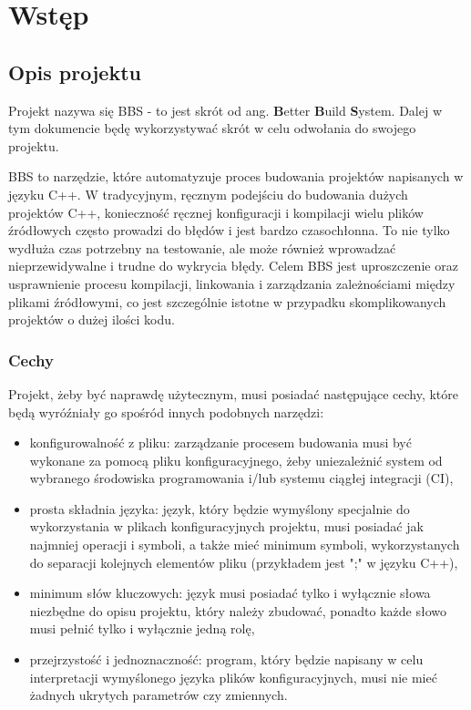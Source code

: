 \chapter{Wstęp}
\section{Opis projektu}

Projekt nazywa się BBS - to jest skrót od ang. \textbf{B}etter \textbf{B}uild \textbf{S}ystem. Dalej w tym dokumencie będę wykorzystywać skrót w celu odwołania do swojego projektu.

BBS to narzędzie, które automatyzuje proces budowania projektów napisanych w języku C++. W tradycyjnym, ręcznym podejściu do budowania dużych projektów C++, konieczność ręcznej konfiguracji i kompilacji wielu plików źródłowych często prowadzi do błędów i jest bardzo czasochłonna. To nie tylko wydłuża czas potrzebny na testowanie, ale może również wprowadzać nieprzewidywalne i trudne do wykrycia błędy. Celem BBS jest uproszczenie oraz usprawnienie procesu kompilacji, linkowania i zarządzania zależnościami między plikami źródłowymi, co jest szczególnie istotne w przypadku skomplikowanych projektów o dużej ilości kodu.

\subsection{Cechy}
Projekt, żeby być naprawdę użytecznym, musi posiadać następujące cechy, które będą wyróźniały go spośród innych podobnych narzędzi:

\begin{itemize}
    \item konfigurowalność z pliku: zarządzanie procesem budowania musi być wykonane za pomocą pliku konfiguracyjnego, żeby uniezależnić system od wybranego środowiska programowania i/lub systemu ciągłej integracji (CI),
    \item prosta składnia języka: język, który będzie wymyślony specjalnie do wykorzystania w plikach konfiguracyjnych projektu, musi posiadać jak najmniej operacji i symboli, a także mieć minimum symboli, wykorzystanych do separacji kolejnych elementów pliku (przykładem jest ";" w języku C++),
    \item minimum słów kluczowych: język musi posiadać tylko i wyłącznie słowa niezbędne do opisu projektu, który należy zbudować, ponadto każde słowo musi pełnić tylko i wyłącznie jedną rolę,
    \item przejrzystość i jednoznaczność: program, który będzie napisany w celu interpretacji wymyślonego języka plików konfiguracyjnych, musi nie mieć żadnych ukrytych parametrów czy zmiennych.
\end{itemize}

